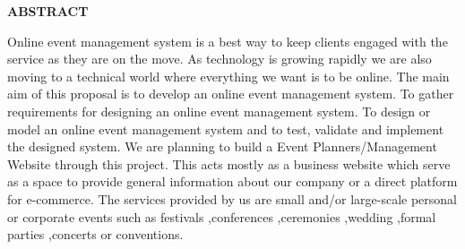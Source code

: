 




\begin{center}
\textbf{\LARGE{ABSTRACT}}\\[1cm]

\end{center}
\normalsize
Online event management system is a best way to keep clients engaged with the service 
as they are on the move. As technology is growing rapidly we are also moving to a 
technical world where everything we want is to be online. The main aim of this proposal 
is to develop an online event management system. To gather requirements for designing an online event management system. 
To design or model an online event management system and to test, validate and 
implement the designed system. We are planning to build a Event Planners/Management Website through this project. This acts mostly as a business website which serve as a space to provide general information about our company or a direct platform for e-commerce. The services provided by us are small and/or large-scale personal or corporate events such as festivals ,conferences ,ceremonies ,wedding ,formal parties ,concerts or conventions. 





